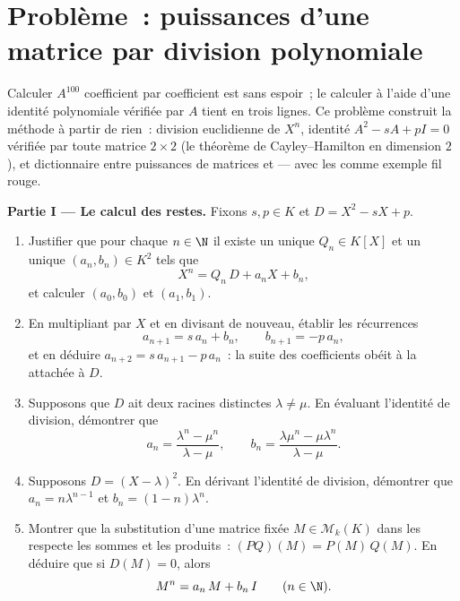 \section{Problème~: puissances d'une matrice par division polynomiale}

\begin{problem}\label{pb:b1:matrices:1}
Calculer $A^{100}$ coefficient par coefficient est sans espoir~; le
calculer à l'aide d'une identité polynomiale vérifiée par $A$ tient en
trois lignes. Ce problème construit la méthode à partir de rien~:
division euclidienne de $X^n$, identité $A^2 - sA + pI = 0$ vérifiée
par toute matrice $2 \times 2$ (le théorème de Cayley--Hamilton en
dimension $2$), et dictionnaire entre puissances de matrices et
 --- avec les  comme exemple
fil rouge.

\medskip
\noindent\textbf{Partie I --- Le calcul des restes.} Fixons $s, p
\in K$ et $D = X^2 - sX + p$.
\begin{enumerate}
  \item Justifier que pour chaque $n \in \N$ il existe un unique $Q_n
        \in K[X]$ et un unique $(a_n, b_n) \in K^2$ tels que
        \[
        X^n = Q_n\,D + a_n X + b_n ,
        \]
        et calculer $(a_0, b_0)$ et $(a_1, b_1)$.
  \item En multipliant par $X$ et en divisant de nouveau, établir les
        récurrences
        \[
        a_{n+1} = s\,a_n + b_n,
        \qquad
        b_{n+1} = -p\,a_n ,
        \]
        et en déduire $a_{n+2} = s\,a_{n+1} - p\,a_n$~: la suite des
        coefficients obéit à la  attachée
        à $D$.
  \item Supposons que $D$ ait deux racines distinctes $\lambda \neq \mu$.
        En évaluant l'identité de division, démontrer que
        \[
        a_n = \frac{\lambda^n - \mu^n}{\lambda - \mu},
        \qquad
        b_n = \frac{\lambda\mu^n - \mu\lambda^n}{\lambda - \mu} .
        \]
  \item Supposons $D = (X - \lambda)^2$. En dérivant l'identité de
        division, démontrer que $a_n = n\lambda^{n-1}$ et
        $b_n = (1 - n)\lambda^{n}$.
  \item Montrer que la substitution d'une matrice fixée $M \in
        \mathcal{M}_k(K)$ dans les  respecte les sommes et les
        produits~: $(PQ)(M) = P(M)\,Q(M)$. En déduire que si $D(M) =
        0$, alors
        \[
        M^n = a_n\,M + b_n\,I \qquad (n \in \N).
        \]
\end{enumerate}


\end{problem}
